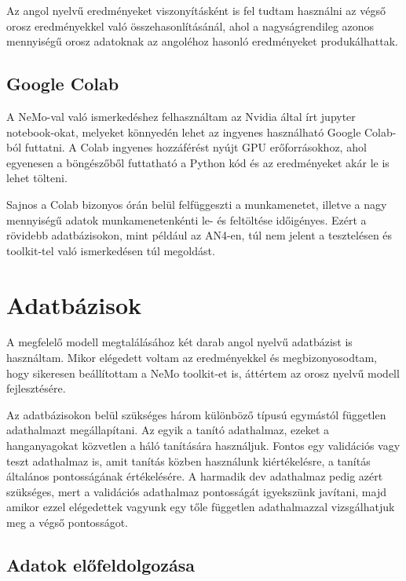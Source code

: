 Az angol nyelvű eredményeket viszonyításként is fel tudtam használni az végső orosz eredményekkel való összehasonlításánál, ahol a nagyságrendileg azonos mennyiségű orosz adatoknak az angoléhoz hasonló eredményeket produkálhattak.

\subsection{Google Colab}

A NeMo-val való ismerkedéshez felhasználtam az Nvidia által írt jupyter notebook-okat, melyeket könnyedén lehet az ingyenes használható Google Colab-ból futtatni. A Colab ingyenes hozzáférést nyújt GPU erőforrásokhoz, ahol egyenesen a böngészőből futtatható a Python kód és az eredményeket akár le is lehet tölteni.

Sajnos a Colab bizonyos órán belül felfüggeszti a munkamenetet, illetve a nagy mennyiségű adatok munkamenetenkénti le- és feltöltése időigényes. Ezért a rövidebb adatbázisokon, mint például az AN4-en, túl nem jelent a tesztelésen és toolkit-tel való ismerkedésen túl megoldást.


\section{Adatbázisok}

A megfelelő modell megtalálásához két darab angol nyelvű adatbázist is használtam. Mikor elégedett voltam az eredményekkel és megbizonyosodtam, hogy sikeresen beállítottam a NeMo toolkit-et is, áttértem az orosz nyelvű modell fejlesztésére.

Az adatbázisokon belül szükséges három különböző típusú egymástól független adathalmazt megállapítani. Az egyik a tanító adathalmaz, ezeket a hanganyagokat közvetlen a háló tanítására használjuk. Fontos egy validációs vagy teszt adathalmaz is, amit tanítás közben használunk kiértékelésre, a tanítás általános pontosságának értékelésére. A harmadik dev adathalmaz pedig azért szükséges, mert a validációs adathalmaz pontosságát igyekszünk javítani, majd amikor ezzel elégedettek vagyunk egy tőle független adathalmazzal vizsgálhatjuk meg a végső pontosságot.

\subsection{Adatok előfeldolgozása}

